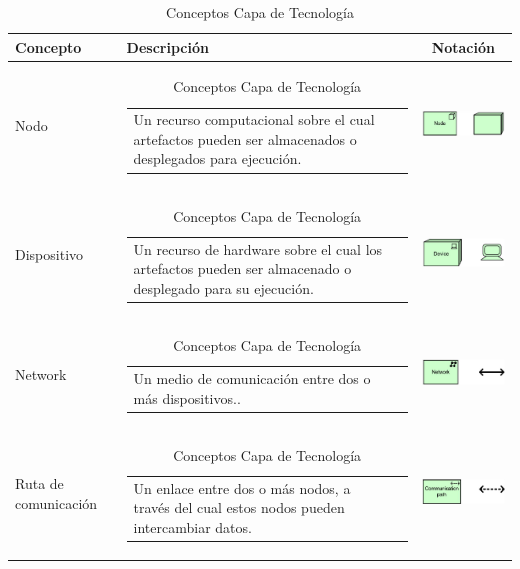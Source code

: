 \begin{longtable}[c]{|p{2.55cm}|l|c|}
	\caption{Conceptos Capa de Tecnología}
	\label{my-label}\\
	\hline
	\textbf{Concepto} 			& \textbf{Descripción}                                                                                                                                            & \textbf{Notación} \\ \hline
	\endhead
	Nodo  						& \begin{tabular}[c]{p{7cm}@{}l@{}}Un recurso computacional sobre el cual artefactos pueden ser almacenados o desplegados para ejecución.\end{tabular}                                                    & \includegraphics[width=35mm]{arquitectura/adm_lenguaje/imgs/technology/Node}           \\ \hline
	Dispositivo    				& \begin{tabular}[c]{p{7cm}@{}l@{}}Un recurso de hardware sobre el cual los artefactos pueden ser almacenado o desplegado para su ejecución.\end{tabular} & \includegraphics[width=35mm]{arquitectura/adm_lenguaje/imgs/technology/Device}          \\ \hline
	Network  					& \begin{tabular}[c]{p{7cm}@{}l@{}}Un medio de comunicación entre dos o más dispositivos..\end{tabular} & \includegraphics[width=35mm]{arquitectura/adm_lenguaje/imgs/technology/Network}          \\ \hline
	Ruta de comunicación		& \begin{tabular}[c]{p{7cm}@{}l@{}}Un enlace entre dos o más nodos, a través del cual estos nodos pueden intercambiar datos.\end{tabular} & \includegraphics[width=35mm]{arquitectura/adm_lenguaje/imgs/technology/CommunicationPath}          \\ \hline

\end{longtable}
